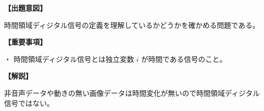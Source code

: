 \noindent \textbf{【出題意図】}

\noindent 時間領域ディジタル信号の定義を理解しているかどうかを確かめる問題である。

\vspace{1em}
\noindent \textbf{【重要事項】}

\medskip
\noindent ・ 時間領域ディジタル信号とは独立変数 $i$ が時間である信号のこと。

\vspace{1em}
\noindent \textbf{【解説】}

\noindent 非音声データや動きの無い画像データは時間変化が無いので時間領域ディジタル信号ではない。
